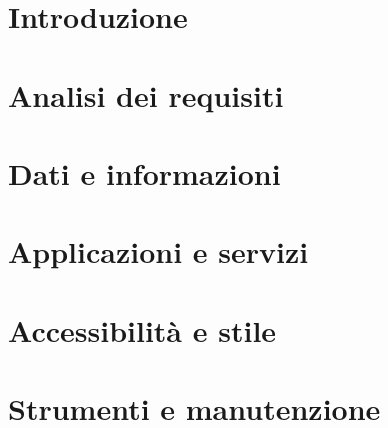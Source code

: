 




\makeFrontPage
\clearpage
\tableofcontents
\listoffigures
\clearpage

\section{Introduzione}

\section{Analisi dei requisiti} %

\section{Dati e informazioni} %

\section{Applicazioni e servizi} %

\section{Accessibilità e stile} %

\section{Strumenti e manutenzione} %

